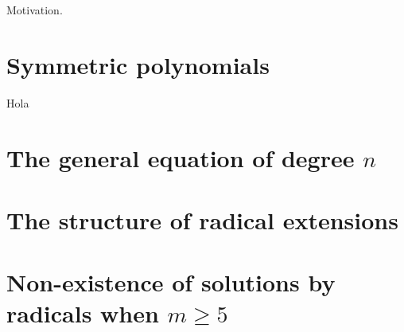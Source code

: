 \documentclass[11pt,a4paper]{article}
\begin{document}
\def\contador{Galois Theory}


Motivation. 


\section{Symmetric polynomials}

Hola

\section[The general equation of degree n]{The general equation of degree \(n\)}

\section{The structure of radical extensions}

\section[Non-existence of solutions by radicals when m ≥ 5]{Non-existence of solutions by radicals when \(m\geq 5\)}

\begin{teo}
    
\end{teo}
\end{document}
